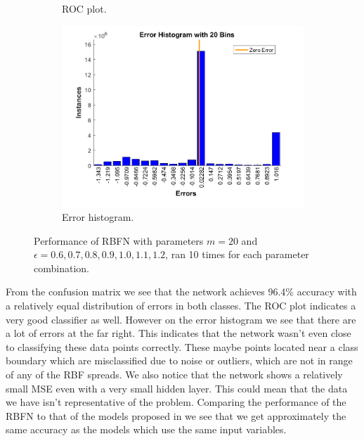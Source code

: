 \documentclass[a4paper, 11pt]{article}
\begin{document}
\begin{figure}[h!]
\begin{subfigure}[t]{0.32\textwidth}
        \caption{ROC plot.}
        \label{fig:roc}
    \end{subfigure}
    \hfill %
    \begin{subfigure}[t]{0.32\textwidth}
        \includegraphics[width=\textwidth]{../figures/final/errhist.png}
        \caption{Error histogram.}
        \label{fig:errhist}
    \end{subfigure}
    \caption{Performance of RBFN with parameters $m = 20$ and $\epsilon = 0.6,0.7, 0.8, 0.9, 1.0, 1.1, 1.2$, ran 10  times for each parameter combination.}\label{fig:accuracy}
\end{figure}


From the confusion matrix we see that the network achieves 96.4\% accuracy with a relatively equal distribution of errors in both classes. The ROC plot indicates a very good classifier as well. However on the error histogram we see that there are a lot of errors at the far right. This indicates that the network wasn't even close to classifying these data points correctly. These maybe points located near a class boundary which are misclassified due to noise or outliers, which are not in range of any of the RBF spreads. We also notice that the network shows a relatively small MSE even with a very small hidden layer. This could mean that the data we have isn't representative of the problem. Comparing the performance of the RBFN to that of the models proposed in \cite{Candanedo2016} we see that we get approximately the same accuracy as the models which use the same input variables.
\end{document}
